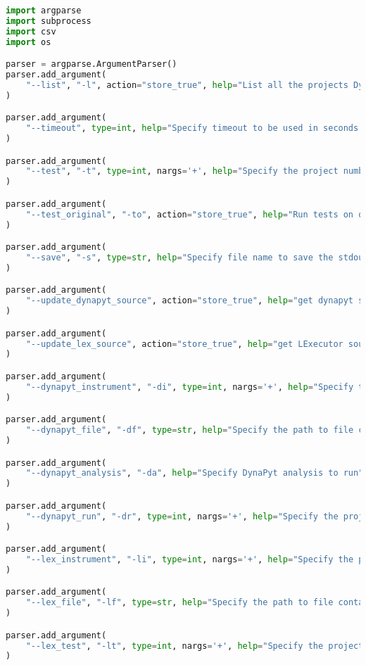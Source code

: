 \lstset{numbers=left, numberstyle=\tiny, stepnumber=1, numbersep=5pt, columns=flexible, breaklines=true, numberblanklines=false}
\lstset{basicstyle=\ttfamily}
\lstset{frame=tb}
\begin{lstlisting}[caption=Access Interface of DyPyBench.,label=code:dypybench.py,language=Python]
import argparse
import subprocess
import csv
import os

parser = argparse.ArgumentParser()
parser.add_argument(
    "--list", "-l", action="store_true", help="List all the projects DyPyBench supports"
)

parser.add_argument(
    "--timeout", type=int, help="Specify timeout to be used in seconds for execution of subprocesses", default=(60*10)
)

parser.add_argument(
    "--test", "-t", type=int, nargs='+', help="Specify the project number to run the test suite"
)

parser.add_argument(
    "--test_original", "-to", action="store_true", help="Run tests on original code"
)

parser.add_argument(
    "--save", "-s", type=str, help="Specify file name to save the stdout and stderr combined"
)

parser.add_argument(
    "--update_dynapyt_source", action="store_true", help="get dynapyt source code"
)

parser.add_argument(
    "--update_lex_source", action="store_true", help="get LExecutor source code"
)

parser.add_argument(
    "--dynapyt_instrument", "-di", type=int, nargs='+', help="Specify the project no. to run DynaPyt instrumentation"
)

parser.add_argument(
    "--dynapyt_file", "-df", type=str, help="Specify the path to file containing the includes.txt file to run the instrumentation"
)

parser.add_argument(
    "--dynapyt_analysis", "-da", help="Specify DynaPyt analysis to run"
)

parser.add_argument(
    "--dynapyt_run", "-dr", type=int, nargs='+', help="Specify the project no. to run DynaPyt Analysis"
)

parser.add_argument(
    "--lex_instrument", "-li", type=int, nargs='+', help="Specify the project no. to run LExecutor instrumentation"
)

parser.add_argument(
    "--lex_file", "-lf", type=str, help="Specify the path to file containing the includes.txt file to run the instrumentation"
)

parser.add_argument(
    "--lex_test", "-lt", type=int, nargs='+', help="Specify the project no. to run test suite for LExecutor"
)


\end{lstlisting}
